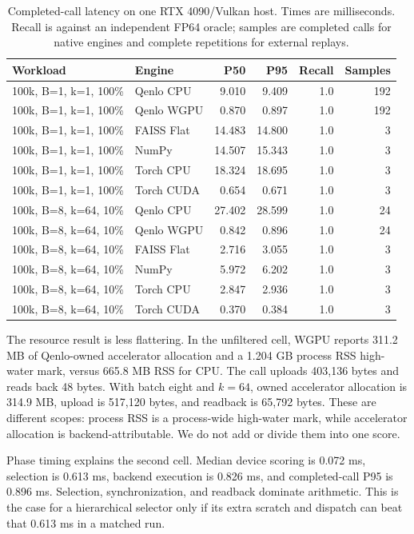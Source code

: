\documentclass[10pt]{article}
\newcommand{\qenlo}{Qenlo}
\begin{document}
\begin{table}[t]
\centering\small
\caption{Completed-call latency on one RTX 4090/Vulkan host. Times are milliseconds. Recall is against an independent FP64 oracle; samples are completed calls for native engines and complete repetitions for external replays.}
\label{tab:headline}
\begin{tabular}{llrrrr}
\toprule
Workload & Engine & P50 & P95 & Recall & Samples \\
\midrule
100k, B=1, k=1, 100\% & Qenlo CPU & 9.010 & 9.409 & 1.0 & 192 \\
100k, B=1, k=1, 100\% & Qenlo WGPU & 0.870 & 0.897 & 1.0 & 192 \\
100k, B=1, k=1, 100\% & FAISS Flat & 14.483 & 14.800 & 1.0 & 3 \\
100k, B=1, k=1, 100\% & NumPy & 14.507 & 15.343 & 1.0 & 3 \\
100k, B=1, k=1, 100\% & Torch CPU & 18.324 & 18.695 & 1.0 & 3 \\
100k, B=1, k=1, 100\% & Torch CUDA & 0.654 & 0.671 & 1.0 & 3 \\
100k, B=8, k=64, 10\% & Qenlo CPU & 27.402 & 28.599 & 1.0 & 24 \\
100k, B=8, k=64, 10\% & Qenlo WGPU & 0.842 & 0.896 & 1.0 & 24 \\
100k, B=8, k=64, 10\% & FAISS Flat & 2.716 & 3.055 & 1.0 & 3 \\
100k, B=8, k=64, 10\% & NumPy & 5.972 & 6.202 & 1.0 & 3 \\
100k, B=8, k=64, 10\% & Torch CPU & 2.847 & 2.936 & 1.0 & 3 \\
100k, B=8, k=64, 10\% & Torch CUDA & 0.370 & 0.384 & 1.0 & 3 \\
\bottomrule
\end{tabular}
\end{table}

The resource result is less flattering. In the unfiltered cell, WGPU reports 311.2 MB of \qenlo-owned accelerator allocation and a 1.204 GB process RSS high-water mark, versus 665.8 MB RSS for CPU. The call uploads 403,136 bytes and reads back 48 bytes. With batch eight and \(k=64\), owned accelerator allocation is 314.9 MB, upload is 517,120 bytes, and readback is 65,792 bytes. These are different scopes: process RSS is a process-wide high-water mark, while accelerator allocation is backend-attributable. We do not add or divide them into one score.

Phase timing explains the second cell. Median device scoring is 0.072 ms, selection is 0.613 ms, backend execution is 0.826 ms, and completed-call P95 is 0.896 ms. Selection, synchronization, and readback dominate arithmetic. This is the case for a hierarchical selector only if its extra scratch and dispatch can beat that 0.613 ms in a matched run.
\end{document}
